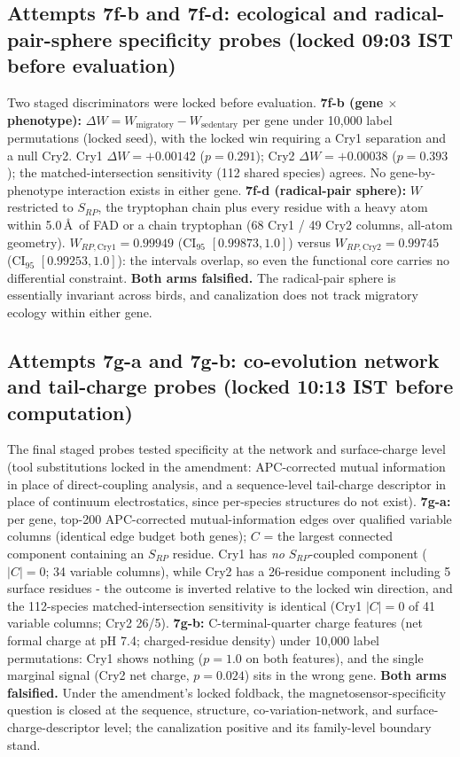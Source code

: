 \documentclass[12pt,a4paper]{article}
\begin{document}
\subsection{Attempts 7f-b and 7f-d: ecological and radical-pair-sphere specificity probes (locked 09:03 IST before evaluation)}
Two staged discriminators were locked before evaluation. \textbf{7f-b (gene $\times$ phenotype):} $\Delta W = W_{\mathrm{migratory}} - W_{\mathrm{sedentary}}$ per gene under 10{,}000 label permutations (locked seed), with the locked win requiring a Cry1 separation and a null Cry2. Cry1 $\Delta W = +0.00142$ ($p=0.291$); Cry2 $\Delta W = +0.00038$ ($p=0.393$); the matched-intersection sensitivity (112 shared species) agrees. No gene-by-phenotype interaction exists in either gene. \textbf{7f-d (radical-pair sphere):} $W$ restricted to $S_{RP}$, the tryptophan chain plus every residue with a heavy atom within 5.0\,\AA\ of FAD or a chain tryptophan (68 Cry1 / 49 Cry2 columns, all-atom geometry). $W_{RP,\mathrm{Cry1}} = 0.99949$ (CI$_{95}$ $[0.99873, 1.0]$) versus $W_{RP,\mathrm{Cry2}} = 0.99745$ (CI$_{95}$ $[0.99253, 1.0]$): the intervals overlap, so even the functional core carries no differential constraint. \textbf{Both arms falsified.} The radical-pair sphere is essentially invariant across birds, and canalization does not track migratory ecology within either gene.

\subsection{Attempts 7g-a and 7g-b: co-evolution network and tail-charge probes (locked 10:13 IST before computation)}
The final staged probes tested specificity at the network and surface-charge level (tool substitutions locked in the amendment: APC-corrected mutual information in place of direct-coupling analysis, and a sequence-level tail-charge descriptor in place of continuum electrostatics, since per-species structures do not exist). \textbf{7g-a:} per gene, top-200 APC-corrected mutual-information edges over qualified variable columns (identical edge budget both genes); $C$ = the largest connected component containing an $S_{RP}$ residue. Cry1 has \emph{no} $S_{RP}$-coupled component ($|C|=0$; 34 variable columns), while Cry2 has a 26-residue component including 5 surface residues - the outcome is inverted relative to the locked win direction, and the 112-species matched-intersection sensitivity is identical (Cry1 $|C|=0$ of 41 variable columns; Cry2 26/5). \textbf{7g-b:} C-terminal-quarter charge features (net formal charge at pH 7.4; charged-residue density) under 10{,}000 label permutations: Cry1 shows nothing ($p=1.0$ on both features), and the single marginal signal (Cry2 net charge, $p=0.024$) sits in the wrong gene. \textbf{Both arms falsified.} Under the amendment's locked foldback, the magnetosensor-specificity question is closed at the sequence, structure, co-variation-network, and surface-charge-descriptor level; the canalization positive and its family-level boundary stand.
\end{document}

